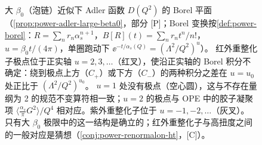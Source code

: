 \begin{figure}[htbp]
\begin{tikzpicture}
\end{tikzpicture}
\caption{大 $\beta_0$（泡链）近似下 Adler 函数 $D(Q^2)$ 的 Borel 平面（\cref{prop:power-adler-large-beta0}，部分 [P]；Borel 变换按\cref{def:power-borel}：$R=\sum_nr_n\alpha_s^{n+1}$，$B[R](t)=\sum_nr_nt^n/n!$，$u=\beta_0t/(4\pi)$，单圈跑动下 $\ee^{-t/\alpha_s(Q)}=(\Lambda^2/Q^2)^u$）。
红外重整化子极点位于正实轴 $u=2,3,\dots$（红叉），使沿正实轴的 Borel 积分不确定：绕到极点上方（$C_+$）或下方（$C_-$）的两种积分之差在 $u=u_0$ 处正比于 $(\Lambda^2/Q^2)^{u_0}$。
$u=1$ 处没有极点（空心圆），这与不存在量纲为 2 的规范不变算符相一致；$u=2$ 的极点与 OPE 中的胶子凝聚项 $\langle\frac{\alpha_s}{\pi}G^2\rangle/Q^4$ 相对应。紫外重整化子位于 $u=-1,-2,\dots$（灰叉）。
只有大 $\beta_0$ 极限中的这一结构是确立的；红外重整化子与高扭度之间的一般对应是猜想（\cref{conj:power-renormalon-ht}，[C]）。}
\label{fig:power-borel-plane}
\end{figure}

